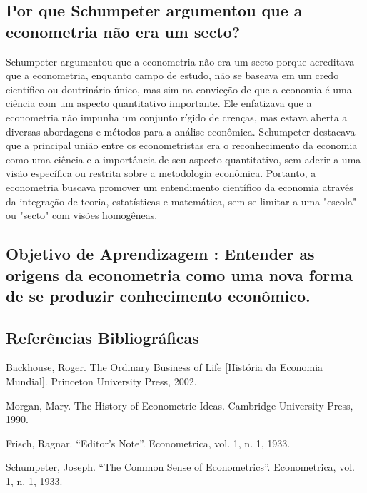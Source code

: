 \documentclass[12pt]{article}
\begin{document}
\subsection{\textbf{Por que Schumpeter argumentou que a econometria não era um secto?}}
Schumpeter argumentou que a econometria não era um secto porque acreditava que a econometria, enquanto campo de estudo, não se baseava em um credo científico ou doutrinário único, mas sim na convicção de que a economia é uma ciência com um aspecto quantitativo importante. Ele enfatizava que a econometria não impunha um conjunto rígido de crenças, mas estava aberta a diversas abordagens e métodos para a análise econômica. Schumpeter destacava que a principal união entre os econometristas era o reconhecimento da economia como uma ciência e a importância de seu aspecto quantitativo, sem aderir a uma visão específica ou restrita sobre a metodologia econômica. Portanto, a econometria buscava promover um entendimento científico da economia através da integração de teoria, estatísticas e matemática, sem se limitar a uma "escola" ou "secto" com visões homogêneas.

\subsection{\textbf{Objetivo de Aprendizagem : Entender as origens da econometria como uma nova forma de se produzir conhecimento econômico.}}

\subsection{\textbf{Referências Bibliográficas}}
Backhouse, Roger. The Ordinary Business of Life [História da Economia Mundial]. Princeton
University Press, 2002.

Morgan, Mary. The History of Econometric Ideas. Cambridge University Press, 1990.

Frisch, Ragnar. “Editor’s Note”. Econometrica, vol. 1, n. 1, 1933.

Schumpeter, Joseph. “The Common Sense of Econometrics”. Econometrica, vol. 1, n. 1,
1933.
\end{document}
